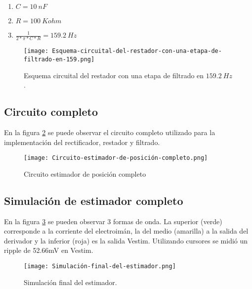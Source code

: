 \begin{enumerate}
	\item  $C=10\ nF$
	
	\item  $R=100\ Kohm$
	
	\item  $\frac{1}{2*\pi *C*R}=159.2\ Hz$
\end{enumerate}

\begin{figure}[H]
	\centering
	\texttt{[image: Esquema-circuital-del-restador-con-una-etapa-de-filtrado-en-159.png]}
	\caption{Esquema circuital del restador con una etapa de filtrado en $159.2\ Hz$.}
	\label{fig:img_Esquema-circuital-del-restador-con-una-etapa-de-filtrado-en-159}
\end{figure}

\subsection{Circuito completo}

\noindent En la figura \ref{fig:img_Circuito_estimador_de_posición_completo} se puede observar el circuito completo utilizado para la implementaci\'{o}n del rectificador, restador y filtrado.

\begin{figure}[H]
	\centering
	\texttt{[image: Circuito-estimador-de-posición-completo.png]}
	\caption{Circuito estimador de posición completo}
	\label{fig:img_Circuito_estimador_de_posición_completo}
\end{figure}

\subsection{Simulaci\'{o}n de estimador completo}

\noindent En la figura \ref{fig:img_Simulación_final_del_estimado} se pueden observar 3 formas de onda. La superior (verde) corresponde a la corriente del electroim\'{a}n, la del medio (amarilla) a la salida del derivador y la inferior (roja) es la salida Vestim. Utilizando cursores se midi\'{o} un ripple de 52.66mV en Vestim.

\begin{figure}[H]
	\centering
	\texttt{[image: Simulación-final-del-estimador.png]}
	\caption{Simulación final del estimador.}
	\label{fig:img_Simulación_final_del_estimado}
\end{figure}

